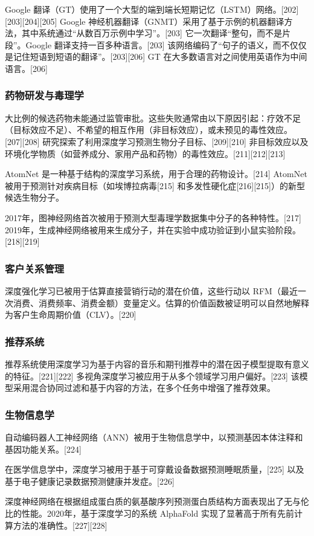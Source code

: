 Google 翻译（GT）使用了一个大型的端到端长短期记忆（LSTM）网络。[202][203][204][205] Google 神经机器翻译（GNMT）采用了基于示例的机器翻译方法，其中系统通过“从数百万示例中学习”。[203] 它一次翻译“整句，而不是片段”。Google 翻译支持一百多种语言。[203] 该网络编码了“句子的语义，而不仅仅是记住短语到短语的翻译”。[203][206] GT 在大多数语言对之间使用英语作为中间语言。[206]
\subsubsection{药物研发与毒理学}  
大比例的候选药物未能通过监管审批。这些失败通常由以下原因引起：疗效不足（目标效应不足）、不希望的相互作用（非目标效应），或未预见的毒性效应。[207][208] 研究探索了利用深度学习预测生物分子目标、[209][210] 非目标效应以及环境化学物质（如营养成分、家用产品和药物）的毒性效应。[211][212][213]  

AtomNet 是一种基于结构的深度学习系统，用于合理的药物设计。[214] AtomNet 被用于预测针对疾病目标（如埃博拉病毒[215] 和多发性硬化症[216][215]）的新型候选生物分子。  

2017年，图神经网络首次被用于预测大型毒理学数据集中分子的各种特性。[217] 2019年，生成神经网络被用来生成分子，并在实验中成功验证到小鼠实验阶段。[218][219]  
\subsubsection{客户关系管理}  
深度强化学习已被用于估算直接营销行动的潜在价值，这些行动以 RFM（最近一次消费、消费频率、消费金额）变量定义。估算的价值函数被证明可以自然地解释为客户生命周期价值（CLV）。[220]
\subsubsection{推荐系统}  
推荐系统使用深度学习为基于内容的音乐和期刊推荐中的潜在因子模型提取有意义的特征。[221][222] 多视角深度学习被应用于从多个领域学习用户偏好。[223] 该模型采用混合协同过滤和基于内容的方法，在多个任务中增强了推荐效果。  
\subsubsection{生物信息学}  
自动编码器人工神经网络（ANN）被用于生物信息学中，以预测基因本体注释和基因功能关系。[224]  

在医学信息学中，深度学习被用于基于可穿戴设备数据预测睡眠质量，[225] 以及基于电子健康记录数据预测健康并发症。[226]  

深度神经网络在根据组成蛋白质的氨基酸序列预测蛋白质结构方面表现出了无与伦比的性能。2020年，基于深度学习的系统 AlphaFold 实现了显著高于所有先前计算方法的准确性。[227][228]  
